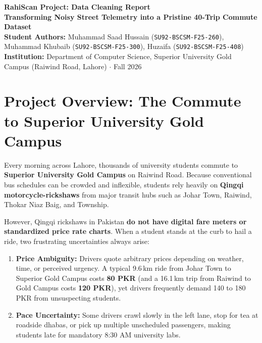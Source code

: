 \documentclass[10pt, a4paper]{article}
\begin{document}

\begin{tcolorbox}[enhanced, colback=navyblue, colframe=navyblue, arc=3pt, left=8pt, right=8pt, top=4.5pt, bottom=4.5pt]
  {\fontsize{14pt}{16pt}\selectfont\color{white}\bfseries RahiScan Project: Data Cleaning Report}\\[1.5pt]
  {\fontsize{9.5pt}{11.5pt}\selectfont\color{softteal}\textbf{Transforming Noisy Street Telemetry into a Pristine 40-Trip Commute Dataset}}\\[1pt]
  {\fontsize{8.5pt}{10.5pt}\selectfont\color{white!85!softblue}\textbf{Student Authors:} Muhammad Saad Hussain (\texttt{SU92-BSCSM-F25-260}), Muhammad Khubaib (\texttt{SU92-BSCSM-F25-300}), Huzaifa (\texttt{SU92-BSCSM-F25-408})\\[0.5pt]
  \textbf{Institution:} Department of Computer Science, Superior University Gold Campus (Raiwind Road, Lahore) \(\cdot\) Fall 2026}
\end{tcolorbox}

\section{Project Overview: The Commute to Superior University Gold Campus}

Every morning across Lahore, thousands of university students commute to \textbf{Superior University Gold Campus} on Raiwind Road. Because conventional bus schedules can be crowded and inflexible, students rely heavily on \textbf{Qingqi motorcycle-rickshaws} from major transit hubs such as Johar Town, Raiwind, Thokar Niaz Baig, and Township.

However, Qingqi rickshaws in Pakistan \textbf{do not have digital fare meters or standardized price rate charts}. When a student stands at the curb to hail a ride, two frustrating uncertainties always arise:
\begin{enumerate}\setlength{\itemsep}{1pt}\setlength{\parskip}{0pt}
  \item \textbf{Price Ambiguity:} Drivers quote arbitrary prices depending on weather, time, or perceived urgency. A typical 9.6\,km ride from Johar Town to Superior Gold Campus costs \textbf{80 PKR} (and a 16.1\,km trip from Raiwind to Gold Campus costs \textbf{120 PKR}), yet drivers frequently demand 140 to 180 PKR from unsuspecting students.
  \item \textbf{Pace Uncertainty:} Some drivers crawl slowly in the left lane, stop for tea at roadside dhabas, or pick up multiple unscheduled passengers, making students late for mandatory 8:30 AM university labs.
\end{enumerate}
\end{document}
